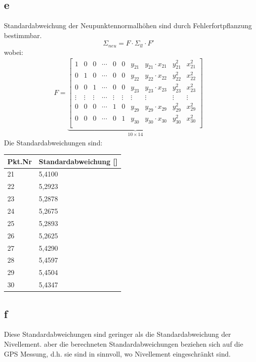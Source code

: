 \subsection{e}
Standardabweichung der Neupunktennormalhöhen sind durch Fehlerfortpflanzung bestimmbar. 
\begin{equation*}
	\Sigma_{neu} = F \cdot \Sigma_{ll} \cdot F'
\end{equation*} 
wobei:
\begin{gather*}
	F = \underbrace{\begin{bmatrix}
	1 & 0 & 0 & \cdots & 0 & 0 & y_{21} & y_{21} \cdot x_{21} & y_{21}^2 & x_{21}^2 \\
	0 & 1 & 0 & \cdots & 0 & 0 & y_{22} & y_{22} \cdot x_{22} & y_{22}^2 & x_{22}^2 \\
	0 & 0 & 1 & \cdots & 0 & 0 & y_{23} & y_{23} \cdot x_{23} & y_{23}^2 & x_{23}^2 \\
	\vdots & \vdots & \vdots & \cdots & \vdots & \vdots & \vdots & \vdots & \vdots & \vdots \\
	0 & 0 & 0 & \cdots & 1 & 0 & y_{29} & y_{29} \cdot x_{29} & y_{29}^2 & x_{29}^2 \\
	0 & 0 & 0 & \cdots & 0 & 1 & y_{30} & y_{30} \cdot x_{30} & y_{30}^2 & x_{30}^2 \\
	\end{bmatrix}}_{\text{$10 \times 14$}}
\end{gather*}
Die Standardabweichungen sind: 
\begin{table}[ht] \centering
	\begin{tabular}{|l|l|}
		\hline
		Pkt.Nr & Standardabweichung [\ut{mm}] \\ \hline
		21     & 5,4100       \\ \hline
		22     & 5,2923       \\ \hline
		23     & 5,2878       \\ \hline
		24     & 5,2675      \\ \hline
		25     & 5,2893    \\ \hline
		26     & 5,2625       \\ \hline
		27     & 5,4290       \\ \hline
		28     & 5,4597       \\ \hline
		29     & 5,4504       \\ \hline
		30     & 5,4347      \\ \hline
	\end{tabular}
\end{table}
\subsection{f}
Diese Standardabweichungen sind geringer als die Standardabweichung der Nivellement. aber die berechneten Standardabweichungen beziehen sich auf die GPS Messung, d.h. sie sind in sinnvoll, wo Nivellement eingeschränkt sind. 
\newpage
